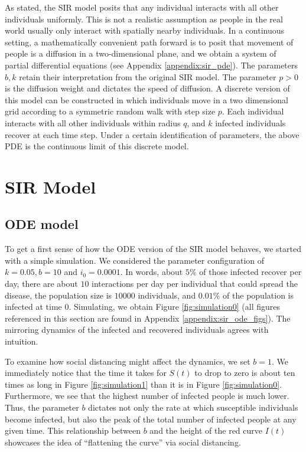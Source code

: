 \documentclass[12pt, reqno]{amsart}
\begin{document}
    As stated, the SIR model posits that any individual interacts with all other individuals uniformly. This is not a realistic assumption as people in the real world usually only interact with spatially nearby individuals. In a continuous setting, a mathematically convenient path forward is to posit that movement of people is a diffusion in a two-dimensional plane, and we obtain a system of partial differential equations (see Appendix \ref{appendix:sir_pde}). The parameters \(b, k\) retain their interpretation from the original SIR model. The parameter \(p > 0\) is the diffusion weight and dictates the speed of diffusion. A discrete version of this model can be constructed in which individuals move in a two dimensional grid according to a symmetric random walk with step size \(p\). Each individual interacts with all other individuals within radius \(q\), and \(k\) infected individuals recover at each time step. Under a certain identification of parameters, the above PDE is the continuous limit of this discrete model. 

    \section{SIR Model} \label{section:SIR_model}

    \subsection{ODE model}
    To get a first sense of how the ODE version of the SIR model behaves, we started with a simple simulation. We considered the parameter configuration of \(k = 0.05, b = 10\) and \(i_0 = 0.0001\). In words, about \(5\%\) of those infected recover per day, there are about \(10\) interactions per day per individual that could spread the disease, the population size is \(10000\) individuals, and \(0.01\%\) of the population is infected at time \(0\). Simulating, we obtain Figure \ref{fig:simulation0} (all figures referenced in this section are found in Appendix \ref{appendix:sir_ode_figs}). The mirroring dynamics of the infected and recovered individuals agrees with intuition. 
    
    To examine how social distancing might affect the dynamics, we set \(b = 1\). We immediately notice that the time it takes for \(S(t)\) to drop to zero is about ten times as long in Figure \ref{fig:simulation1} than it is in Figure \ref{fig:simulation0}. Furthermore, we see that the highest number of infected people is much lower. Thus, the parameter \(b\) dictates not only the rate at which susceptible individuals become infected, but also the peak of the total number of infected people at any given time. This relationship between \(b\) and the height of the red curve \(I(t)\) showcases the idea of ``flattening the curve'' via social distancing. 
\end{document}

